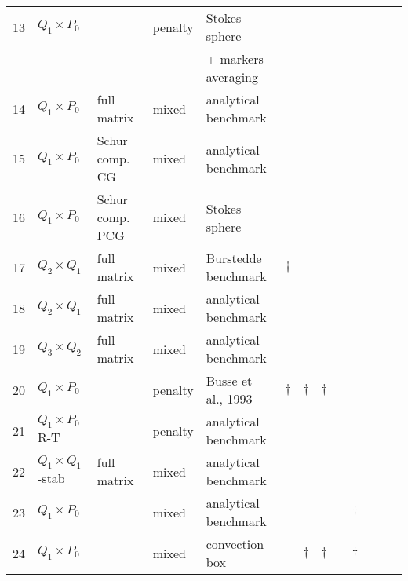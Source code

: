 \begin{landscape}
{\begin{tabular}{|p{0.4cm}||p{1.9cm}p{3.6cm}p{1.5cm}p{4.5cm}|p{0.2cm}|p{0.2cm}|p{0.2cm}|p{0.2cm}|p{0.2cm}|p{0.2cm}|p{0.2cm}|p{0.2cm}|}
\hline
13 & $Q_1 \times P_0$ &              & penalty & Stokes sphere               &  &       &        & &&&&\\ 
   &                  &              &         & + markers averaging         &   &       &        & &&&&\\
\hline
14 & $Q_1 \times P_0$ & full matrix & mixed   & analytical benchmark        &  &       &        & & &&&\\ 
\hline
15 & $Q_1 \times P_0$ & Schur comp. CG & mixed   & analytical benchmark        &  &       &        & &&&&\\ 
\hline
16 & $Q_1 \times P_0$ & Schur comp. PCG & mixed   & Stokes sphere               &  &       &        & &&&&\\ 
\hline
17 & $Q_2 \times Q_1$ & full matrix & mixed   & Burstedde benchmark         & $\dag$ &       &        & &&&&\\ 
\hline
18 & $Q_2 \times Q_1$ & full matrix & mixed   & analytical benchmark        &  &       &        & &&&&\\ 
\hline
19 & $Q_3 \times Q_2$ & full matrix & mixed   & analytical benchmark        &  &       &        & &&&&\\ 
\hline
20 & $Q_1 \times P_0$ &              & penalty & Busse et al., 1993            & $\dag$ & $\dag$& $\dag$ & & & &&\\ 
\hline
21 & $Q_1 \times P_0$ R-T  &              & penalty & analytical benchmark        &  &       &        & &&&&\\ 
\hline
22 & $Q_1 \times Q_1$-stab & full matrix  & mixed & analytical benchmark    &  &       &        & &&&&\\ 
\hline
23 & $Q_1 \times P_0$ &              & mixed  & analytical benchmark         &  &       &        & & $\dag$ &&&\\ 
\hline
24 & $Q_1 \times P_0$ &              & mixed  & convection box               &  & $\dag$& $\dag$ & & $\dag$ &&&\\
\hline
\hline
\end{tabular}


}
\end{landscape}
